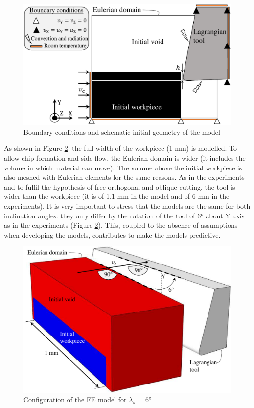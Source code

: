 \documentclass[final,5p,times,twocolumn]{elsarticle}
\begin{document}
\begin{figure}[h]
\centering
\includegraphics[width=\columnwidth]{Figures/BC}
\caption{Boundary conditions and schematic initial geometry of the model}
\label{BC}
\end{figure}

As shown in Figure \ref{FEConfig}, the full width of the workpiece (1 mm) is modelled. To allow chip formation and side flow, the Eulerian domain is wider (it includes the volume in which material can move). The volume above the initial workpiece is also meshed with Eulerian elements for the same reasons. As in the experiments and to fulfil the hypothesis of free orthogonal and oblique cutting, the tool is wider than the workpiece (it is of 1.1 mm in the model and of 6 mm in the experiments). It is very important to stress that the models are the same for both inclination angles: they only differ by the rotation of the tool of 6° about Y axis as in the experiments (Figure \ref{FEConfig}). This, coupled to the absence of assumptions when developing the models, contributes to make the models predictive.

\begin{figure}[h]
\centering
\includegraphics[width=\columnwidth]{Figures/FEConfig}
\caption{Configuration of the FE model for $\lambda_s$ = 6°}
\label{FEConfig}
\end{figure}
\end{document}
